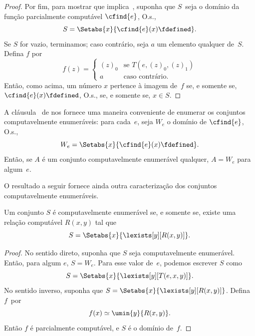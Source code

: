 \documentclass[../../../include/open-logic-section]{subfiles}
\begin{document}
\begin{proof}
Por fim, para mostrar que  implica~,
suponha que $S$~seja o domínio da função parcialmente computável
$\cfind{e}$, O.s.\@,
\[
S = \Setabs{x}{\cfind{e}(x) \fdefined}.
\]
Se $S$ for vazio, terminamos; caso contrário, seja $a$ um elemento
qualquer de~$S$. Defina $f$ por
\[
f(z) = \begin{cases}
(z)_0 & \text{se $T(e,(z)_0,(z)_1)$} \\
a & \text{caso contrário.}
\end{cases}
\]
Então, como acima, um número $x$ pertence à imagem de~$f$ se, e
somente se, $\cfind{e}(x) \fdefined$, O.s.\@, se, e somente se,
$x \in S$. 
\end{proof}

A cláusula~ de  nos fornece
uma maneira conveniente de enumerar os conjuntos computavelmente
enumeráveis: para cada~$e$, seja $W_e$ o domínio de $\cfind{e}$, O.s.\@,
\[
W_e = \Setabs{x}{\cfind{e}(x) \fdefined}.
\] 
Então, se $A$ é um conjunto computavelmente enumerável qualquer,
$A = W_e$ para algum~$e$.

O resultado a seguir fornece ainda outra caracterização dos conjuntos
computavelmente enumeráveis.

\begin{thm}
Um conjunto $S$ é computavelmente enumerável se, e somente se, existe
uma relação computável $R(x,y)$ tal que
\[
S = \Setabs{ x }{ \lexists[y][R(x,y)] }.
\]
\end{thm}

\begin{proof}
No sentido direto, suponha que $S$ seja computavelmente enumerável.
Então, para algum $e$, $S = W_e$. Para esse valor de~$e$, podemos
escrever $S$ como
\[
S = \Setabs{ x }{ \lexists[y][T(e, x, y)] }.
\]
No sentido inverso, suponha que $S = \Setabs{ x }{
  \lexists[y][R(x, y)] }$. Defina $f$~por
\[
f(x) \simeq \umin{y}{R(x, y)}.
\]
Então $f$ é parcialmente computável, e $S$ é o domínio de~$f$.
\end{proof}
\end{document}
